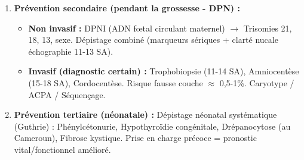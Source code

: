 \documentclass[11pt]{article}
\begin{document}
\begin{methode}
\begin{enumerate}
        \item \textbf{Prévention secondaire (pendant la grossesse - DPN) :}
            \begin{itemize}
                \item \textbf{Non invasif :} DPNI (ADN fœtal circulant maternel) $\to$ Trisomies 21, 18, 13, sexe. Dépistage combiné (marqueurs sériques + clarté nucale échographie 11-13 SA).
                \item \textbf{Invasif (diagnostic certain) :} Trophobiopsie (11-14 SA), Amniocentèse (15-18 SA), Cordocentèse. Risque fausse couche $\approx$ 0,5-1\%. Caryotype / ACPA / Séquençage.
            \end{itemize}
        \item \textbf{Prévention tertiaire (néonatale) :} Dépistage néonatal systématique (Guthrie) : Phénylcétonurie, Hypothyroïdie congénitale, Drépanocytose (au Cameroun), Fibrose kystique. Prise en charge précoce = pronostic vital/fonctionnel amélioré.
    \end{enumerate}
\end{methode}
\end{document}
